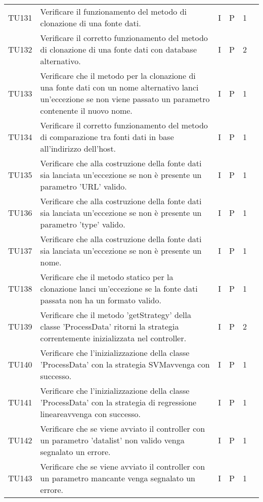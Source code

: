 \begin{longtable} {
		>{}p{12mm}
		>{}p{79.5mm}
		>{}p{9mm}
		>{}p{8mm}
		>{}p{14mm}
		>{}p{0mm}}
	TU131		& Verificare il funzionamento del metodo di clonazione di una fonte dati. & I & P & 1 & \TBstrut \\ [2mm]
	TU132		& Verificare il corretto funzionamento del metodo di clonazione di una fonte dati con database alternativo. & I & P & 2 & \TBstrut \\ [2mm]
	TU133		& Verificare che il metodo per la clonazione di una fonte dati con un nome alternativo lanci un'eccezione se non viene passato un parametro contenente il nuovo nome. & I & P & 1 & \TBstrut \\ [2mm]
	TU134		& Verificare il corretto funzionamento del metodo di comparazione tra fonti dati in base all'indirizzo dell'host. & I & P & 1 & \TBstrut \\ [2mm]
	TU135		& Verificare che alla costruzione della fonte dati sia lanciata un'eccezione se non è presente un parametro 'URL' valido. & I & P & 1 & \TBstrut \\ [2mm]
	TU136		& Verificare che alla costruzione della fonte dati sia lanciata un'eccezione se non è presente un parametro 'type' valido. & I & P & 1 & \TBstrut \\ [2mm]
	TU137		& Verificare che alla costruzione della fonte dati sia lanciata un'eccezione se non è presente un nome. & I & P & 1 & \TBstrut \\ [2mm]
	TU138		& Verificare che il metodo statico per la clonazione lanci un'eccezione se la fonte dati passata non ha un formato valido. & I & P & 1 & \TBstrut \\ [2mm]
	TU139		& Verificare che il metodo 'getStrategy' della classe 'ProcessData' ritorni la strategia correntemente inizializzata nel controller. & I & P & 2 & \TBstrut \\ [2mm]
	TU140		& Verificare che l'inizializzazione della classe 'ProcessData' con la strategia SVM\glosp avvenga con successo. & I & P & 1 & \TBstrut \\ [2mm]
	TU141		& Verificare che l'inizializzazione della classe 'ProcessData' con la strategia di regressione lineare\glosp avvenga con successo. & I & P & 1 & \TBstrut \\ [2mm]
	TU142		& Verificare che se viene avviato il controller con un parametro 'datalist' non valido venga segnalato un errore. & I & P & 1 & \TBstrut \\ [2mm]
	TU143		& Verificare che se viene avviato il controller con un parametro mancante venga segnalato un errore. & I & P & 1 & \TBstrut \\ [2mm]

\end{longtable}
